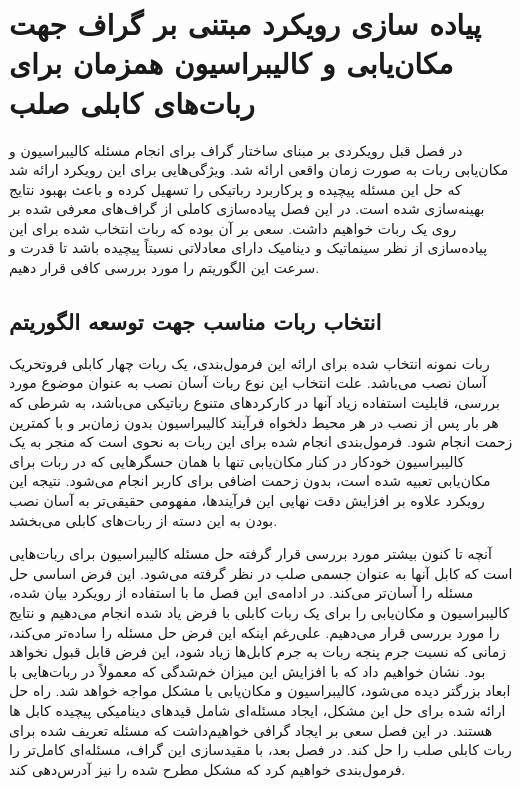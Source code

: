 \chapter{پیاده سازی رویکرد مبتنی بر گراف جهت مکان‌یابی و کالیبراسیون همزمان برای ربات‌های کابلی صلب}

در فصل قبل رویکردی بر مبنای ساختار گراف برای انجام مسئله کالیبراسیون و مکان‌یابی ربات به صورت زمان واقعی ارائه شد. ویژگی‌هایی برای این رویکرد ارائه شد که حل این مسئله پیچیده و پرکاربرد رباتیکی را تسهیل کرده و باعث بهبود نتایج بهینه‌سازی شده است. در این فصل پیاده‌سازی کاملی از گراف‌های معرفی شده بر روی یک ربات خواهیم داشت. سعی بر آن بوده که ربات انتخاب شده برای این پیاده‌سازی از نظر سینماتیک و دینامیک دارای معادلاتی نسبتاً پیچیده باشد تا قدرت و سرعت این الگوریتم را مورد بررسی کافی قرار دهیم.


\section{انتخاب ربات مناسب جهت توسعه الگوریتم}

ربات نمونه انتخاب شده برای ارائه این فرمول‌بندی، یک ربات چهار کابلی فروتحریک آسان نصب می‌باشد. علت انتخاب این نوع ربات آسان نصب به عنوان موضوع مورد بررسی، قابلیت استفاده زیاد آنها در کارکردهای متنوع رباتیکی می‌باشد، به شرطی که هر بار پس از نصب در هر محیط دلخواه فرآیند کالیبراسیون بدون زمان‌بر و با کمترین زحمت انجام شود. فرمول‌بندی انجام شده برای این ربات به نحوی است که منجر به یک کالیبراسیون خودکار در کنار مکان‌یابی تنها با همان حسگرهایی که در ربات برای مکان‌یابی تعبیه شده است، بدون زحمت اضافی برای کاربر انجام می‌شود. نتیجه این رویکرد علاوه بر افزایش دقت نهایی این فرآیندها، مفهومی حقیقی‌تر به آسان نصب بودن به این دسته از ربات‌های کابلی می‌بخشد.

آنچه تا کنون بیشتر مورد بررسی قرار گرفته حل مسئله کالیبراسیون برای ربات‌هایی است که کابل آنها به عنوان جسمی صلب در نظر گرفته می‌شود. این فرض اساسی حل مسئله را آسان‌تر می‌کند. در ادامه‌ی این فصل ما با استفاده از رویکرد بیان شده، کالیبراسیون و مکان‌یابی را برای یک ربات کابلی با فرض یاد شده انجام می‌دهیم و نتایج را مورد بررسی قرار می‌دهیم. علی‌رغم اینکه این فرض حل مسئله را ساده‌تر می‌کند، زمانی که نسبت جرم پنجه ربات به جرم کابل‌ها زیاد شود، این فرض قابل قبول نخواهد بود. نشان خواهیم داد که با افزایش این میزان خم‌شدگی که معمولاً در ربات‌هایی با ابعاد بزرگتر دیده می‌شود، کالیبراسیون و مکان‌یابی با مشکل مواجه خواهد شد. راه حل ارائه شده برای حل این مشکل، ایجاد مسئله‌ای شامل قیدهای دینامیکی پیچیده کابل ها هستند. در این فصل سعی بر ایجاد گرافی خواهیم‌داشت که مسئله تعریف شده برای ربات کابلی صلب را حل کند. در فصل بعد، با مقید‌سازی این گراف، مسئله‌ای کامل‌تر  را فرمول‌بندی خواهیم کرد که مشکل مطرح شده را نیز آدرس‌دهی کند.


